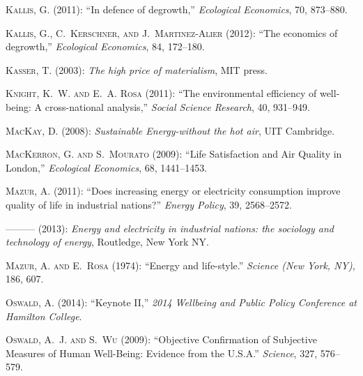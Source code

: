 \documentclass[10pt, letterpaper]{article}
\begin{document}
\begin{spacing}{1.5}
\begin{thebibliography}{52}
\textsc{Kallis, G.} (2011): \enquote{In defence of degrowth,} \emph{Ecological
  Economics}, 70, 873--880.

\textsc{Kallis, G., C.~Kerschner, and J.~Martinez-Alier} (2012): \enquote{The
  economics of degrowth,} \emph{Ecological Economics}, 84, 172--180.

\textsc{Kasser, T.} (2003): \emph{The high price of materialism}, MIT press.

\textsc{Knight, K.~W. and E.~A. Rosa} (2011): \enquote{The environmental
  efficiency of well-being: A cross-national analysis,} \emph{Social Science
  Research}, 40, 931--949.

\textsc{MacKay, D.} (2008): \emph{Sustainable Energy-without the hot air}, UIT
  Cambridge.

\textsc{MacKerron, G. and S.~Mourato} (2009): \enquote{Life Satisfaction and
  Air Quality in London,} \emph{Ecological Economics}, 68, 1441--1453.

\textsc{Mazur, A.} (2011): \enquote{Does increasing energy or electricity
  consumption improve quality of life in industrial nations?} \emph{Energy
  Policy}, 39, 2568--2572.

---\hspace{-.1pt}---\hspace{-.1pt}--- (2013): \emph{Energy and electricity in
  industrial nations: the sociology and technology of energy}, Routledge, New
  York NY.

\textsc{Mazur, A. and E.~Rosa} (1974): \enquote{Energy and life-style.}
  \emph{Science (New York, NY)}, 186, 607.

\textsc{Oswald, A.} (2014): \enquote{Keynote II,} \emph{2014 Wellbeing and
  Public Policy Conference at Hamilton College}.

\textsc{Oswald, A.~J. and S.~Wu} (2009): \enquote{{Objective Confirmation of
  Subjective Measures of Human Well-Being: Evidence from the U.S.A.}}
  \emph{Science}, 327, 576--579.


\end{thebibliography}
\end{spacing}
\end{document}
